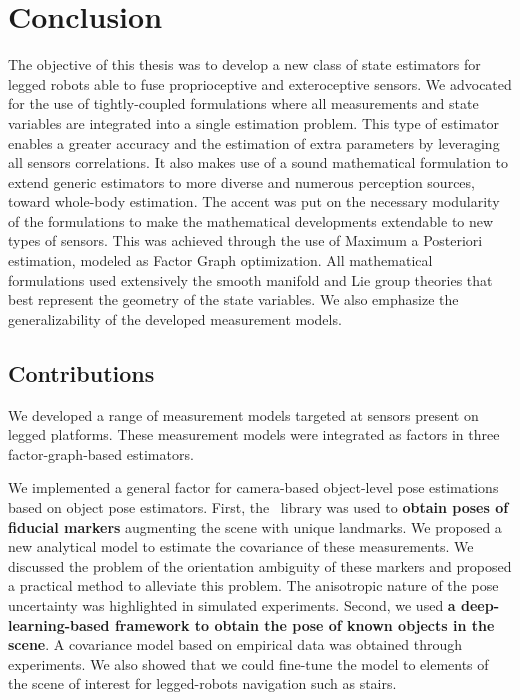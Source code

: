 \chapter{Conclusion}

The objective of this thesis was to develop a new class of state estimators for legged robots able to fuse proprioceptive and exteroceptive
sensors. We advocated for the use of tightly-coupled formulations where all measurements and state variables are integrated into a single estimation 
problem. This type of estimator enables a greater accuracy and the estimation of extra parameters by leveraging all sensors correlations.
It also makes use of a sound mathematical formulation to extend generic estimators to more diverse and numerous perception sources, toward whole-body estimation.
The accent was put on the necessary modularity of the formulations to make the mathematical developments extendable to new types of sensors. This 
was achieved through the use of Maximum a Posteriori estimation, modeled as Factor Graph optimization. All mathematical formulations used extensively the smooth manifold
and Lie group theories that best represent the geometry of the state variables. We also emphasize the generalizability of the developed measurement models. 

\section{Contributions}

We developed a range of measurement models targeted at sensors present on legged platforms. These measurement models were integrated as factors in 
three factor-graph-based estimators.

We implemented a general factor for camera-based object-level pose estimations based on object pose estimators. 
First, the \apriltag\ library was used 
to \textbf{obtain poses of fiducial markers} augmenting the scene with unique landmarks. We proposed a new analytical model to estimate the covariance of 
these measurements. We discussed the problem of the orientation ambiguity of these markers and proposed a practical method to alleviate this problem.
The anisotropic nature of the pose uncertainty was highlighted in simulated experiments. 
Second, we used \textbf{a deep-learning-based framework to obtain the pose of known objects in the scene}. A covariance model based on empirical data was obtained through
experiments. We also showed that we could fine-tune the model to elements of the scene of interest for legged-robots navigation such as stairs.

